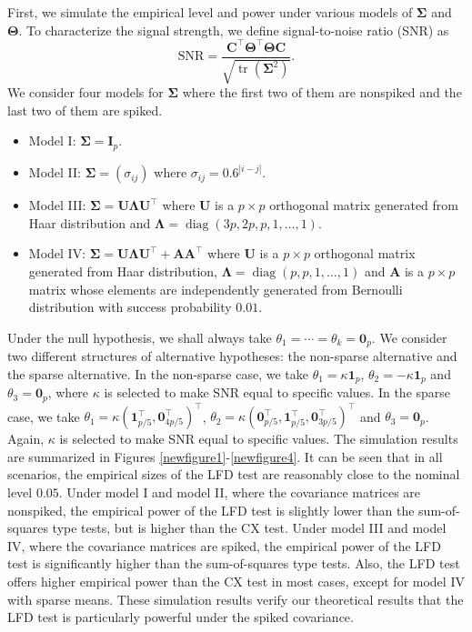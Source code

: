 \documentclass[12pt]{article} %
\DeclareMathOperator{\mytr}{tr}
\DeclareMathOperator{\mydiag}{diag}
\newcommand{\bA}{\mathbf{A}}
\newcommand{\bC}{\mathbf{C}}
\newcommand{\bI}{\mathbf{I}}
\newcommand{\bU}{\mathbf{U}}
\newcommand{\bfsym}[1]{\ensuremath{\boldsymbol{#1}}}
\def\bLambda {\bfsym {\Lambda}}
\def\bSigma {\bfsym {\Sigma}}
\def\bTheta {\bfsym {\Theta}}
\theoremstyle{definition}
\begin{document}
First, we simulate the empirical level and power under various models of $\bSigma$ and $\bTheta$.
To characterize the signal strength,
we define signal-to-noise ratio (SNR) as
$$
\textrm{SNR}=\frac{ \bC^\top \bTheta^\top \bTheta\bC}{\sqrt{\mytr(\bSigma^2)}}.
$$
We consider four models for $\bSigma$ where the first two of them are nonspiked and the last two of them are spiked.
\begin{itemize}
    \item Model I:
        $\bSigma= \bI_p$.
    \item Model II:
        $\bSigma = (\sigma_{ij})$ where $\sigma_{ij}=0.6^{|i-j|}$.
    \item Model III:
        $\bSigma= \bU \bLambda \bU^\top$ where $\bU$ is a $p\times p$ orthogonal matrix generated from Haar distribution and $\bLambda=\mydiag(3p,2p,p,1,\ldots,1)$.
    \item Model IV:
        $\bSigma=  \bU \bLambda \bU^\top+\bA \bA^\top$ where $\bU$ is a $p\times p$ orthogonal matrix generated from Haar distribution, $\bLambda=\mydiag(p,p,1,\ldots,1)$ and $\bA$ is a $p\times p$ matrix whose elements are independently generated from Bernoulli distribution with success probability $0.01$.
\end{itemize}
Under the null hypothesis, we shall always take $\theta_1=\cdots=\theta_k=\mathbf{0}_p$. We consider two different structures of alternative hypotheses: the non-sparse alternative and the sparse alternative.
In the non-sparse case, we take $\theta_1=\kappa \mathbf 1_p$, $\theta_2=-\kappa \mathbf 1_p$ and $\theta_3=\mathbf{0}_p$, where $\kappa$ is selected to make SNR equal to specific values.
In the sparse case, we take $\theta_1=\kappa (\mathbf 1_{p/5}^\top,\mathbf{0}_{4p/5}^\top)^\top$, $\theta_2=\kappa (\mathbf{0}_{p/5}^\top, \mathbf 1_{p/5}^\top,\mathbf{0}_{3p/5}^\top)^\top$ and $\theta_3=\mathbf{0}_p$.
Again, $\kappa$ is selected to make SNR equal to specific values.
The simulation results are summarized in Figures \ref{newfigure1}-\ref{newfigure4}.
It can be seen that in all scenarios, the empirical sizes of the LFD test are reasonably close to the nominal level $0.05$.
Under model I and model II, where the covariance matrices are nonspiked, the empirical power of the LFD test is slightly lower than the sum-of-squares type tests, but is higher than the CX test.
Under model III and model IV, where the covariance matrices are spiked, the empirical power of the LFD test is significantly higher than the sum-of-squares type tests.
Also, the LFD test offers higher empirical power than the CX test in most cases, except for model IV with sparse means.
These simulation results verify our theoretical results that the LFD test is particularly powerful under the spiked covariance.
\end{document}
